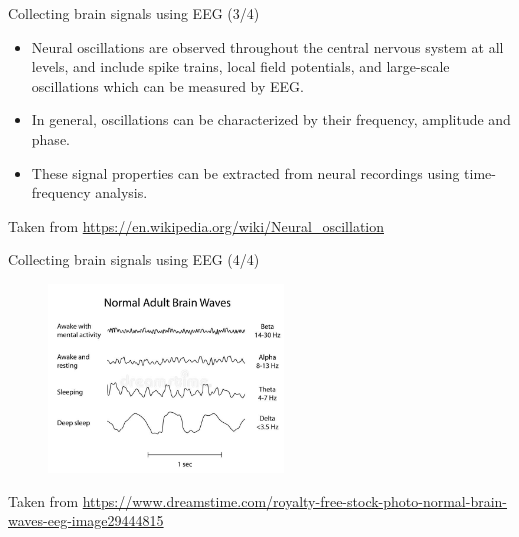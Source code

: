 \documentclass{beamer}
\begin{document}
\begin{frame}
{\centerline{Collecting brain signals using EEG (3/4)}}
 \begin{itemize}
     \item Neural oscillations are observed throughout the central nervous system at all levels, and include spike trains, local field potentials, and large-scale oscillations which can be measured by EEG.
     \item In general, oscillations can be characterized by their frequency, amplitude and phase.
     \item These signal properties can be extracted from neural recordings using time-frequency analysis.
 \end{itemize}
   \begin{center}
       \tiny{Taken from \url{https://en.wikipedia.org/wiki/Neural_oscillation}}
   \end{center}
\end{frame}

\begin{frame}
{\centerline{Collecting brain signals using EEG (4/4)}}
    \begin{figure}
        \centering
        \includegraphics[height=5cm]{P2023.AIBCCSS.BrainSignals/normal-brain-waves-eeg-29444815.jpg}
    \end{figure}
    \begin{center}
    \tiny{Taken from \url{https://www.dreamstime.com/royalty-free-stock-photo-normal-brain-waves-eeg-image29444815}}
    \end{center}  
\end{frame}
\end{document}
